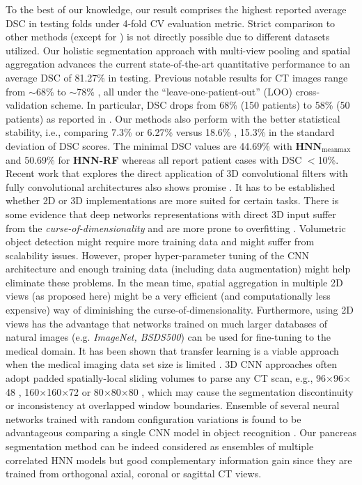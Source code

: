 \documentclass[journal]{IEEEtran}
\begin{document}
\noindent To the best of our knowledge, our result comprises the highest reported average DSC in testing folds under 4-fold CV evaluation metric. Strict comparison to other methods (except for \cite{roth2015deeporgan,roth2016spatial}) is not directly possible due to different datasets utilized. Our holistic segmentation approach with multi-view pooling and spatial aggregation advances the current state-of-the-art quantitative performance to an average DSC of 81.27\% in testing. Previous notable results for CT images range from $\sim$68\% to $\sim$78\% \cite{wolz2013automated,Chu2013Miccai,tong2015discriminative,okada2015abdominal,oda2016regression}, all under the ``leave-one-patient-out'' (LOO) cross-validation scheme. In particular, DSC drops from 68\% (150 patients) to 58\% (50 patients) as reported in \cite{wolz2013automated}. Our methods also perform with the better statistical stability, i.e., comparing 7.3\%  or 6.27\% versus 18.6\% \cite{Wang2014Miccai}, 15.3\% \cite{Chu2013Miccai} in the standard deviation of DSC scores. The minimal DSC values are 44.69\% with $\mathbf{HNN}_\mathrm{meanmax}$ and 50.69\% for \textbf{HNN-RF} whereas \cite{Wang2014Miccai,Chu2013Miccai,wolz2013automated,roth2015deeporgan} all report patient cases with DSC $<$10\%. 
Recent work that explores the direct application of 3D convolutional filters with fully convolutional architectures also shows promise \cite{ronneberger2015unet,Merkow2016Dense}. It has to be established whether 2D or 3D implementations are more suited for certain tasks. There is some evidence that deep networks representations with direct 3D input suffer from the \textit{curse-of-dimensionality} and are more prone to overfitting \cite{roth2016improving,Su2015Multi,Su2016Volumetric}. Volumetric object detection might require more training data and might suffer from scalability issues. However, proper hyper-parameter tuning of the CNN architecture and enough training data (including data augmentation) might help eliminate these problems. In the mean time, spatial aggregation in multiple 2D views (as proposed here) might be a very efficient (and computationally less expensive) way of diminishing the curse-of-dimensionality. Furthermore, using 2D views has the advantage that networks trained on much larger databases of natural images (e.g. \textit{ImageNet, BSDS500}) can be used for fine-tuning to the medical domain. It has been shown that transfer learning is a viable approach when the medical imaging data set size is limited \cite{Shin2016Deep,tajbakhsh2016convolutional}. 3D CNN approaches often adopt padded spatially-local sliding volumes to parse any CT scan, e.g., 96$\times$96$\times$48 \cite{Merkow2016Dense}, 160$\times$160$\times$72 \cite{Dou20163D} or 80$\times$80$\times$80 \cite{Chen2016VoxResNet}, which may cause the segmentation discontinuity or inconsistency at overlapped window boundaries. Ensemble of several neural networks trained with random configuration variations is found to be advantageous comparing a single CNN model in object recognition \cite{simonyan2014very,krizhevsky2012imagenet,Simonyan2014Two}. Our pancreas segmentation method can be indeed considered as ensembles of multiple correlated HNN models but good complementary information gain since they are trained from orthogonal axial, coronal or sagittal CT views.  
\end{document}

